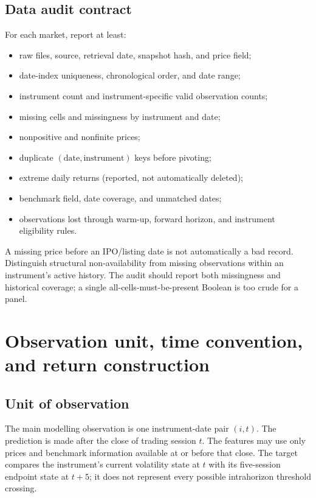 \documentclass[11pt,a4paper]{article}
\begin{document}
\subsection{Data audit contract}
\label{sec:auditcontract}

For each market, report at least:
\begin{itemize}
  \item raw files, source, retrieval date, snapshot hash, and price field;
  \item date-index uniqueness, chronological order, and date range;
  \item instrument count and instrument-specific valid observation counts;
  \item missing cells and missingness by instrument and date;
  \item nonpositive and nonfinite prices;
  \item duplicate $(\text{date},\text{instrument})$ keys before pivoting;
  \item extreme daily returns (reported, not automatically deleted);
  \item benchmark field, date coverage, and unmatched dates;
  \item observations lost through warm-up, forward horizon, and instrument eligibility rules.
\end{itemize}

A missing price before an IPO/listing date is not automatically a bad record. Distinguish structural non-availability from missing observations within an instrument's active history. The audit should report both missingness and historical coverage; a single all-cells-must-be-present Boolean is too crude for a panel.

\section{Observation unit, time convention, and return construction}
\label{sec:returns}

\subsection{Unit of observation}

\begin{decisionbox}
The main modelling observation is one instrument-date pair $(i,t)$. The prediction is made after the close of trading session $t$. The features may use only prices and benchmark information available at or before that close. The target compares the instrument's current volatility state at $t$ with its five-session endpoint state at $t+5$; it does not represent every possible intrahorizon threshold crossing.
\end{decisionbox}
\end{document}
